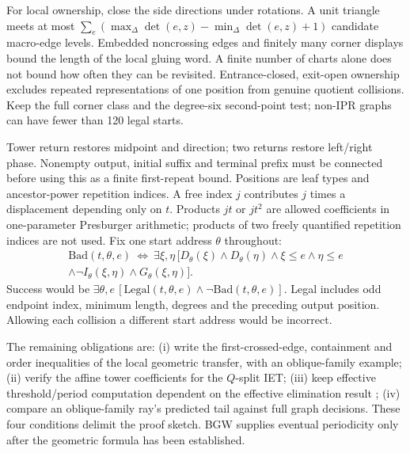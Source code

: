\documentclass[11pt]{amsart}
\theoremstyle{definition}\newtheorem{definition}{Definition}
\begin{document}
For local ownership, close the side directions under rotations. A
unit triangle meets at most
$\sum_e(\max_\Delta\det(e,z)-\min_\Delta\det(e,z)+1)$
candidate macro-edge levels. Embedded noncrossing edges and finitely
many corner displays bound the length of the local gluing word.
A finite number of charts alone does not bound how often they can
be revisited. Entrance-closed, exit-open ownership excludes repeated
representations of one position from genuine quotient collisions.
Keep the full corner class and the degree-six second-point test;
non-IPR graphs can have fewer than 120 legal starts.

Tower return restores midpoint and direction; two returns restore
left/right phase. Nonempty output, initial suffix and terminal prefix
must be connected before using this as a finite first-repeat bound.
Positions are leaf types and ancestor-power repetition indices.
A free index $j$ contributes $j$ times a displacement depending only
on $t$. Products $jt$ or $jt^2$ are allowed coefficients in one-parameter
Presburger arithmetic; products of two freely quantified repetition
indices are not used. Fix one start address $\theta$ throughout:
\[
\begin{split}
\mathrm{Bad}(t,\theta,e)\ \Longleftrightarrow\
\exists\xi,\eta\,[D_\theta(\xi)\wedge D_\theta(\eta)
\wedge\xi\le e\wedge\eta\le e\\
\wedge\neg I_\theta(\xi,\eta)\wedge G_\theta(\xi,\eta)].
\end{split}
\]
Success would be $\exists\theta,e\,[\mathrm{Legal}(t,\theta,e)
\wedge\neg\mathrm{Bad}(t,\theta,e)]$. Legal includes odd endpoint index,
minimum length, degrees and the preceding output position. Allowing
each collision a different start address would be incorrect.

The remaining obligations are: (i) write the first-crossed-edge,
containment and order inequalities of the local geometric transfer, with an
oblique-family example; (ii) verify the affine tower coefficients
for the $Q$-split IET; (iii) keep effective threshold/period computation
dependent on the effective elimination result \cite{QE}; (iv) compare an oblique-family ray's predicted
tail against full graph decisions. These four conditions delimit the proof sketch.
BGW supplies eventual periodicity only after the geometric formula
has been established.
\end{document}
